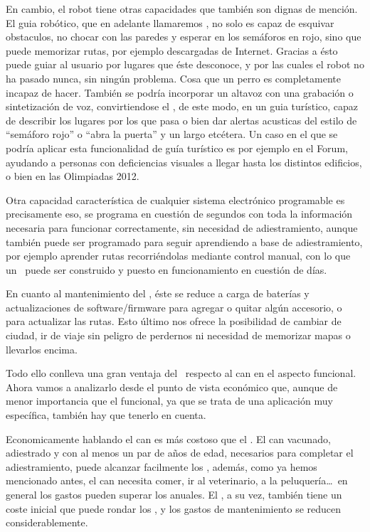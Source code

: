 En cambio, el robot tiene otras capacidades que también son dignas de mención. El guia robótico, que en adelante llamaremos \bott, no solo es capaz de esquivar obstaculos, no chocar con las paredes y esperar en los semáforos en rojo, sino que puede memorizar rutas, por ejemplo descargadas de Internet. Gracias a ésto puede guiar al usuario por lugares que éste desconoce, y por las cuales el robot no ha pasado nunca, sin ningún problema. Cosa que un perro es completamente incapaz de hacer. También se podría incorporar un altavoz con una grabación o sintetización de voz, convirtiendose el \bott, de este modo, en un guia turístico, capaz de describir los lugares por los que pasa o bien dar alertas acusticas del estilo de ``semáforo rojo'' o ``abra la puerta'' y un largo etcétera. Un caso en el que se podría aplicar esta funcionalidad de guía turístico es por ejemplo en el Forum, ayudando a personas con deficiencias visuales a llegar hasta los distintos edificios, o bien en las Olimpiadas 2012.\par
Otra capacidad característica de cualquier sistema electrónico programable es precisamente eso, se programa en cuestión de segundos con toda la información necesaria para funcionar correctamente, sin necesidad de adiestramiento, aunque también puede ser programado para seguir aprendiendo a base de adiestramiento, por ejemplo aprender rutas recorriéndolas mediante control manual, con lo que un \bott \ puede ser construido y puesto en funcionamiento en cuestión de días.\par
En cuanto al mantenimiento del \bott, éste se reduce a carga de baterías y actualizaciones de software/firmware para agregar o quitar algún accesorio, o para actualizar las rutas. Esto último nos ofrece la posibilidad de cambiar de ciudad, ir de viaje sin peligro de perdernos ni necesidad de memorizar mapas o llevarlos encima.\par
Todo ello conlleva una gran ventaja del \bott \ respecto al can en el aspecto funcional. Ahora vamos a analizarlo desde el punto de vista económico que, aunque de menor importancia que el funcional, ya que se trata de una aplicación muy específica, también hay que tenerlo en cuenta.\par
Economicamente hablando el can es más costoso que el \bott. El can vacunado, adiestrado y con al menos un par de años de edad, necesarios para completar el adiestramiento, puede alcanzar facilmente los , además, como ya hemos mencionado antes, el can necesita comer, ir al veterinario, a la peluquería\dots \ en general los gastos pueden superar los  anuales\cite{web:perro}. El \bott, a su vez, también tiene un coste inicial que puede rondar los , y los gastos de mantenimiento se reducen considerablemente.\par
